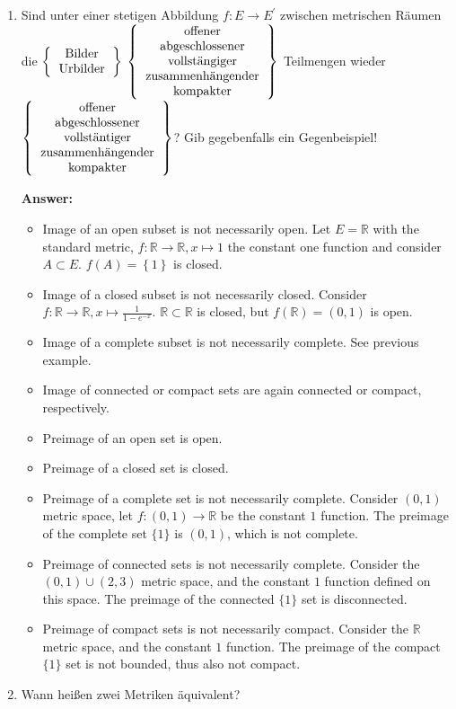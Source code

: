 \documentclass[11pt]{article}
\newcommand{\RR}[0]{\mathbb{R}}
\begin{document}
\begin{enumerate}
    \item Sind unter einer stetigen Abbildung $f: E \to E^\prime$ zwischen metrischen Räumen die $\left\{\begin{tabular}{c}
        \text{Bilder}\\
        \text{Urbilder}
    \end{tabular}\right\}$ $\left\{\begin{tabular}{c}
    \text{offener}\\
    \text{abgeschlossener}\\
    \text{vollstängiger}\\
    \text{zusammenhängender}\\
    \text{kompakter}
    \end{tabular}\right\}$ Teilmengen wieder $\left\{\begin{tabular}{c}
        \text{offener}\\
        \text{abgeschlossener}\\
        \text{vollstäntiger}\\
        \text{zusammenhängender}\\
        \text{kompakter}
        \end{tabular}\right\}$?
    Gib gegebenfalls ein Gegenbeispiel!

    \textbf{Answer:}
    \begin{itemize}
        \item Image of an open subset is not necessarily open. Let $E = \RR$ with the standard metric, $f\colon \RR \to \RR, x \mapsto 1$ the constant one function and consider $A \subset E$. $f(A) = \left\{1\right\}$ is closed.
        \item Image of a closed subset is not necessarily closed. Consider $f\colon \RR \to \RR, x \mapsto \frac{1}{1-e^{-x}}$. $\RR \subset \RR$ is closed, but $f(\RR) = (0, 1)$ is open.
        \item Image of a complete subset is not necessarily complete. See previous example.
        \item Image of connected or compact sets are again connected or compact, respectively.
        \item Preimage of an open set is open.
        \item Preimage of a closed set is closed.
        \item Preimage of a complete set is not necessarily complete. Consider $(0, 1)$ metric space, let $f\colon (0, 1) \to \RR$ be the constant $1$ function. The preimage of the complete set $\{1\}$ is $(0, 1)$, which is not complete.
        \item Preimage of connected sets is not necessarily complete. Consider the $(0, 1) \cup (2, 3)$ metric space, and the constant $1$ function defined on this space. The preimage of the connected $\{1\}$ set is disconnected.
        \item Preimage of compact sets is not necessarily compact. Consider the $\RR$ metric space, and the constant $1$ function. The preimage of the compact $\{1\}$ set is not bounded, thus also not compact.
    \end{itemize}
    \item Wann heißen zwei Metriken äquivalent?


\end{enumerate}
\end{document}

